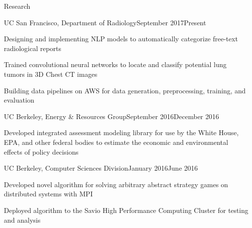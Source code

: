 \documentclass{resume} %
\begin{document}
\begin{rSection}{Research}
\begin{rSubsection}{UC San Francisco, Department of Radiology}{September 2017\textminus Present}{}{}
\item[] Designing and implementing NLP models to automatically categorize free-text radiological reports
\item[] Trained convolutional neural networks to locate and classify potential lung tumors in 3D Chest CT images
\item[] Building data pipelines on AWS for data generation, preprocessing, training, and evaluation
\end{rSubsection}
\begin{rSubsection}{UC Berkeley, Energy \& Resources Group}{September 2016\textminus December 2016}{}{}
\item[] Developed integrated assessment modeling library for use by the White House, EPA, and other federal bodies to estimate the economic and environmental effects of policy decisions
\end{rSubsection}
\begin{rSubsection}{UC Berkeley, Computer Sciences Division}{January 2016\textminus June 2016}{}{}
\item[] Developed novel algorithm for solving arbitrary abstract strategy games on distributed systems with MPI
\item[] Deployed algorithm to the Savio High Performance Computing Cluster for testing and analysis
\end{rSubsection}
\end{rSection}






\end{document}
